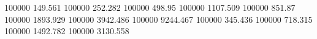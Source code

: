 100000   149.561    %
100000   252.282    %
100000   498.95     %
100000   1107.509   %
100000   851.87     %
100000   1893.929   %
100000   3942.486   %
100000   9244.467   %
100000   345.436    %
100000   718.315    %
100000   1492.782   %
100000   3130.558   %
